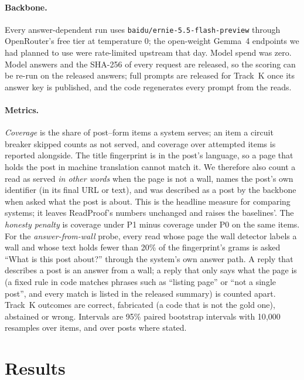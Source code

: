 \paragraph{Backbone.}
Every answer-dependent run uses \texttt{baidu/ernie-5.5-flash-preview} through OpenRouter's free tier at
temperature 0; the open-weight Gemma~4 endpoints we had planned to use were rate-limited upstream that day. Model
spend was zero. Model answers and the SHA-256 of every request are released, so the scoring can be re-run on the
released answers; full prompts are released for Track~K once its answer key is published, and the code regenerates
every prompt from the reads.

\paragraph{Metrics.}
\emph{Coverage} is the share of post--form items a system serves; an item a circuit breaker skipped counts as not
served, and coverage over attempted items is reported alongside. The title fingerprint is in the post's language,
so a page that holds the post in machine translation cannot match it. We therefore also count a read as served
\emph{in other words} when the page is not a wall, names the post's own identifier (in its final URL or text), and
was described as a post by the backbone when asked what the post is about. This is the headline measure for
comparing systems; it leaves ReadProof's numbers unchanged and raises the baselines'. The \emph{honesty penalty} is
coverage under P1 minus coverage under P0 on the same items. For the \emph{answer-from-wall} probe, every read whose
page the wall detector labels a wall and whose text holds fewer than 20\% of the fingerprint's grams is asked ``What
is this post about?'' through the system's own answer path. A reply that describes a post is an answer from a wall;
a reply that only says what the page is (a fixed rule in code matches phrases such as ``listing page'' or ``not a
single post'', and every match is listed in the released summary) is counted apart. Track~K outcomes are correct,
fabricated (a code that is not the gold one), abstained or wrong. Intervals are 95\% paired bootstrap intervals with
10{,}000 resamples over items, and over posts where stated.

\section{Results}\label{sec:results}

